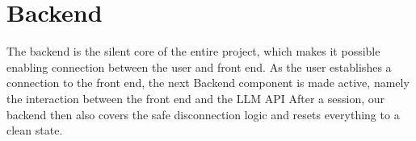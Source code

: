 \chapter{Backend}

The backend is the silent core of the entire project, which makes it possible enabling connection between the user and front end.
As the user establishes a connection to the front end, the next Backend component is made active, namely the interaction between the front end and the LLM API
After a session, our backend then also covers the safe disconnection logic and resets everything to a clean state. 


